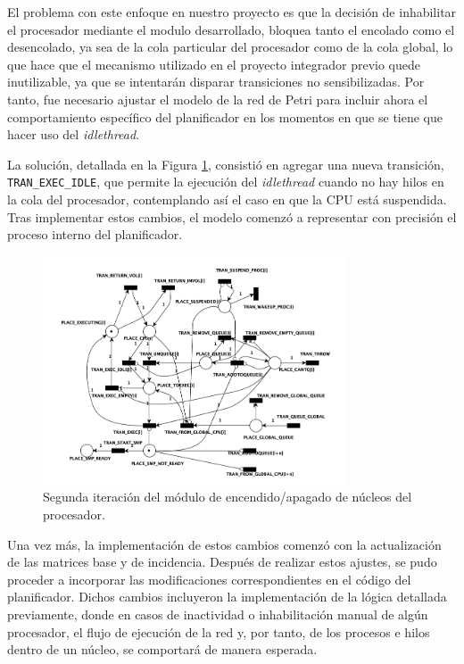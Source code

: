 El problema con este enfoque en nuestro proyecto es que la decisión de inhabilitar el procesador mediante el modulo desarrollado, bloquea tanto el encolado como el desencolado, ya sea de la cola particular del procesador como de la cola global, lo que hace que el mecanismo utilizado en el proyecto integrador previo quede inutilizable, ya que se intentarán disparar transiciones no sensibilizadas. Por tanto, fue necesario ajustar el modelo de la red de Petri para incluir ahora el comportamiento específico del planificador en los momentos en que se tiene que hacer uso del \textit{idlethread}.

La solución, detallada en la Figura \ref{fig:cpu-on-off-2nd-iteration}, consistió en agregar una nueva transición, \texttt{TRAN\_EXEC\_IDLE}, que permite la ejecución del \textit{idlethread} cuando no hay hilos en la cola del procesador, contemplando así el caso en que la CPU está suspendida. Tras implementar estos cambios, el modelo comenzó a representar con precisión el proceso interno del planificador.\par

\begin{figure}[H]
    \centering
    \vspace*{0.1in}
    \includegraphics[width=0.8\textwidth]{./images/cpuOnOff-2nd-iteration.png}
    \caption{Segunda iteración del módulo de encendido/apagado de núcleos del procesador.}
    \label{fig:cpu-on-off-2nd-iteration}
\end{figure}

Una vez más, la implementación de estos cambios comenzó con la actualización de las matrices base y de incidencia. Después de realizar estos ajustes, se pudo proceder a incorporar las modificaciones correspondientes en el código del planificador. Dichos cambios incluyeron la implementación de la lógica detallada previamente, donde en casos de inactividad o inhabilitación manual de algún procesador, el flujo de ejecución de la red y, por tanto, de los procesos e hilos dentro de un núcleo, se comportará de manera esperada.\par

